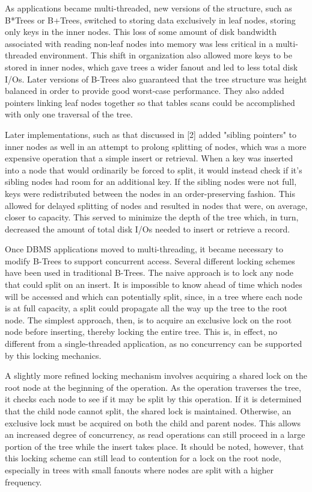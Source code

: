 \documentclass{sig-alternate}
\begin{document}
As applications became multi-threaded, new versions of the structure, such as B*Trees or B+Trees, switched to storing data exclusively in leaf nodes, storing only keys in the inner nodes. This loss of some amount of disk bandwidth associated with reading non-leaf nodes into memory was less critical in a multi-threaded environment. This shift in organization also allowed more keys to be stored in inner nodes, which gave trees a wider fanout and led to less total disk I/Os. Later versions of B-Trees also guaranteed that the tree structure was height balanced in order to provide good worst-case performance. They also added pointers linking leaf nodes together so that tables scans could be accomplished with only one traversal of the tree.  

Later implementations, such as that discussed in [2] added "sibling pointers" to inner nodes as well in an attempt to prolong splitting of nodes, which was a more expensive operation that a simple insert or retrieval. When a key was inserted into a node that would ordinarily be forced to split, it would instead check if it's sibling nodes had room for an additional key. If the sibling nodes were not full, keys were redistributed between the nodes in an order-preserving fashion. This allowed for delayed splitting of nodes and resulted in nodes that were, on average, closer to capacity. This served to minimize the depth of the tree which, in turn, decreased the amount of total disk I/Os needed to insert or retrieve a record.

Once DBMS applications moved to multi-threading, it became necessary to modify B-Trees to support concurrent access.  Several different locking schemes have been used in traditional B-Trees. The naive approach is to lock any node that could split on an insert.  It is impossible to know ahead of time which nodes will be accessed and which can potentially split, since, in a tree where each node is at full capacity, a split could propagate all the way up the tree to the root node. The simplest approach, then, is to acquire an exclusive lock on the root node before inserting, thereby locking the entire tree\cite{graefe:survey}. This is, in effect, no different from a single-threaded application, as no concurrency can be supported by this locking mechanics.

A slightly more refined locking mechanism involves acquiring a shared lock on the root node at the beginning of the operation. As the operation traverses the tree, it checks each node to see if it may be split by this operation. If it is determined that the child node cannot split, the shared lock is maintained. Otherwise, an exclusive lock must be acquired on both the child and parent nodes. This allows an increased degree of concurrency, as read operations can still proceed in a large portion of the tree while the insert takes place\cite{graefe:survey}\cite{lehman:locking}.  It should be noted, however, that this locking scheme can still lead to contention for a lock on the root node, especially in trees with small fanouts where nodes are split with a higher frequency.
\end{document}
